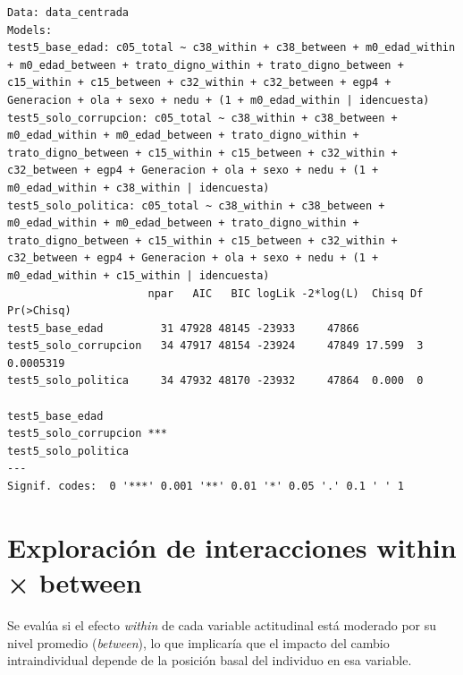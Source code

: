 \documentclass[
  spanish,
  a4paper,
  oneside]{scrbook}
\begin{document}
\begin{verbatim}
Data: data_centrada
Models:
test5_base_edad: c05_total ~ c38_within + c38_between + m0_edad_within + m0_edad_between + trato_digno_within + trato_digno_between + c15_within + c15_between + c32_within + c32_between + egp4 + Generacion + ola + sexo + nedu + (1 + m0_edad_within | idencuesta)
test5_solo_corrupcion: c05_total ~ c38_within + c38_between + m0_edad_within + m0_edad_between + trato_digno_within + trato_digno_between + c15_within + c15_between + c32_within + c32_between + egp4 + Generacion + ola + sexo + nedu + (1 + m0_edad_within + c38_within | idencuesta)
test5_solo_politica: c05_total ~ c38_within + c38_between + m0_edad_within + m0_edad_between + trato_digno_within + trato_digno_between + c15_within + c15_between + c32_within + c32_between + egp4 + Generacion + ola + sexo + nedu + (1 + m0_edad_within + c15_within | idencuesta)
                      npar   AIC   BIC logLik -2*log(L)  Chisq Df Pr(>Chisq)
test5_base_edad         31 47928 48145 -23933     47866                     
test5_solo_corrupcion   34 47917 48154 -23924     47849 17.599  3  0.0005319
test5_solo_politica     34 47932 48170 -23932     47864  0.000  0           
                         
test5_base_edad          
test5_solo_corrupcion ***
test5_solo_politica      
---
Signif. codes:  0 '***' 0.001 '**' 0.01 '*' 0.05 '.' 0.1 ' ' 1
\end{verbatim}

\chapter{Exploración de interacciones within ×
between}\label{exploraciuxf3n-de-interacciones-within-between}

Se evalúa si el efecto \emph{within} de cada variable actitudinal está
moderado por su nivel promedio (\emph{between}), lo que implicaría que
el impacto del cambio intraindividual depende de la posición basal del
individuo en esa variable.
\end{document}
